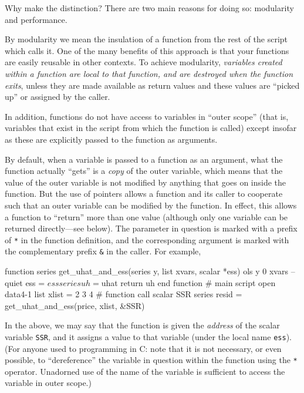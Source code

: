 Why make the distinction? There are two main reasons for doing so:
modularity and performance.

By modularity we mean the insulation of a function from the rest of
the script which calls it.  One of the many benefits of this approach
is that your functions are easily reusable in other contexts.  To
achieve modularity, \emph{variables created within a function are
  local to that function, and are destroyed when the function exits},
unless they are made available as return values and these values are
``picked up'' or assigned by the caller.
    
In addition, functions do not have access to variables in ``outer
scope'' (that is, variables that exist in the script from which the
function is called) except insofar as these are explicitly passed to
the function as arguments.

By default, when a variable is passed to a function as an argument,
what the function actually ``gets'' is a \emph{copy} of the outer
variable, which means that the value of the outer variable is not
modified by anything that goes on inside the function.  But the use of
pointers allows a function and its caller to cooperate such that an
outer variable can be modified by the function.  In effect, this
allows a function to ``return'' more than one value (although only one
variable can be returned directly---see below).  The parameter in
question is marked with a prefix of \texttt{*} in the function
definition, and the corresponding argument is marked with the
complementary prefix \verb+&+ in the caller.  For example,
%
\begin{code}
function series get_uhat_and_ess(series y, list xvars, scalar *ess)
  ols y 0 xvars --quiet
  ess = $ess
  series uh = $uhat
  return uh
end function
# main script
open data4-1
list xlist = 2 3 4
# function call
scalar SSR
series resid = get_uhat_and_ess(price, xlist, &SSR)
\end{code}
%
In the above, we may say that the function is given the \emph{address}
of the scalar variable \texttt{SSR}, and it assigns a value to that
variable (under the local name \texttt{ess}).  (For anyone used to
programming in C: note that it is not necessary, or even possible, to
``dereference'' the variable in question within the function using the
\texttt{*} operator.  Unadorned use of the name of the variable is
sufficient to access the variable in outer scope.)

